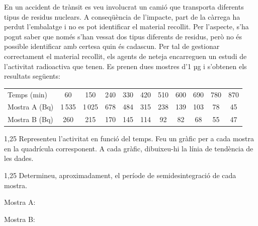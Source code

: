 En un accident de trànsit es veu involucrat un camió que transporta diferents tipus de residus nuclears. A conseqüència de l'impacte, part de la càrrega ha perdut l'embalatge i no es pot identificar el material recollit. Per l'aspecte, s'ha pogut saber que només s'han vessat dos tipus diferents de residus, però no és possible identificar amb certesa quin és cadascun. Per tal de gestionar correctament el material recollit, els agents de neteja encarreguen un estudi de l'activitat radioactiva que tenen. Es prenen dues mostres d'1 µg i s'obtenen els resultats següents:

\begin{center}
\small
\begin{tabular}{lcccccccccc}
\toprule
Temps (min) & 60 & 150 & 240 & 330 & 420 & 510 & 600 & 690 & 780 & 870\\
Mostra A (Bq) & 1\,535 & 1\,025 & 678 & 484 & 315 & 238 & 139 & 103 & 78 & 45\\
Mostra B (Bq) & 260 & 215 & 170 & 145 & 114 & 92 & 82 & 68 & 55 & 47\\
\bottomrule
\end{tabular}
\end{center}

\begin{apartat}{1,25}
Representeu l'activitat en funció del temps. Feu un gràfic per a cada mostra en la quadrícula corresponent. A cada gràfic, dibuixeu-hi la línia de tendència de les dades.
\end{apartat}

\begin{apartat}{1,25}
Determineu, aproximadament, el període de semidesintegració de cada mostra.
\end{apartat}

Mostra A:

Mostra B:
